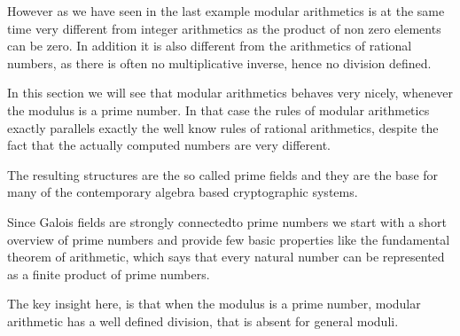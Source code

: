 However as we have seen in the last example modular arithmetics is at the same time very different from integer arithmetics as the product of non zero elements can be zero. In addition it is also different from the arithmetics of rational numbers, as there is often no multiplicative inverse, hence no division defined. 

In this section we will see that modular arithmetics behaves very nicely, whenever the modulus is a prime number. In that case the rules of modular arithmetics exactly parallels exactly the well know rules of rational arithmetics, despite the fact that the actually computed numbers are very different.

The resulting structures are the so called prime fields and they are the base for many of the contemporary algebra based cryptographic systems.

Since Galois fields are strongly connectedto prime numbers we start with
a short overview of prime numbers and provide few basic properties like the fundamental theorem of arithmetic, which says that every natural number can be represented as a finite product of prime numbers.

The key insight here, is that when the modulus is a prime number, modular arithmetic has a well defined division, that is absent for general moduli.




